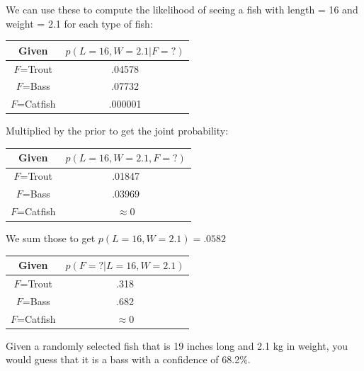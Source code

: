 We can use these to compute the likelihood of seeing a fish with length = 16 and weight = 2.1 for each type of fish:

\begin{tabular}{c | c }
Given & $p(L=16, W=2.1 | F=?)$ \\
\hline
$F$=Trout & .04578 \\
$F$=Bass &  .07732 \\
$F$=Catfish  & .000001 
\end{tabular}

Multiplied by the prior to get the joint probability:

\begin{tabular}{c | c }
Given & $p(L=16, W=2.1, F=?)$ \\
\hline
$F$=Trout & .01847 \\
$F$=Bass &  .03969 \\
$F$=Catfish  &  $\approx 0$
\end{tabular}

We sum those to get $p(L=16, W=2.1) = .0582$

\begin{tabular}{c | c }
Given & $p(F=? | L=16, W=2.1)$ \\
\hline
$F$=Trout & .318 \\
$F$=Bass &  .682 \\
$F$=Catfish  &  $\approx 0$
\end{tabular}

Given a randomly selected fish that is 19 inches long and 2.1 kg in weight,  you would guess that it is a bass with a confidence of 68.2\%.



